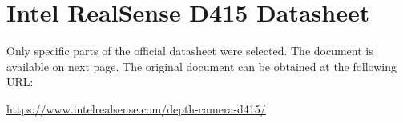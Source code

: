 \chapter{Intel\textregistered{} RealSense\texttrademark{} D415 Datasheet}
\label{ann:d415_datasheet}

Only specific parts of the official datasheet were selected. The document is available on next page. The original document can be obtained at the following URL:

\url{https://www.intelrealsense.com/depth-camera-d415/}


